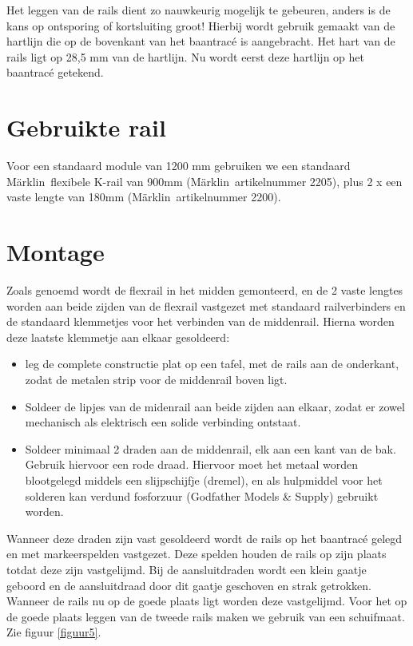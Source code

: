 \documentclass[12pt,a4paper]{report}
\newcommand*{\marklin}{M\"{a}rklin}
\newcommand*{\trace}{trac\'{e} }
\begin{document}
Het leggen van de rails dient zo nauwkeurig mogelijk te gebeuren, anders is de kans op ontsporing of kortsluiting groot! Hierbij wordt gebruik gemaakt van de hartlijn die op de bovenkant van het baan\trace is aangebracht.
Het hart van de rails ligt op 28,5 mm van de hartlijn. Nu wordt eerst deze hartlijn op het baan\trace getekend.

\section{Gebruikte rail}
Voor een standaard module van 1200 mm gebruiken we een standaard \marklin \ flexibele K-rail van 900mm (\marklin \ artikelnummer 2205), plus 2 x een vaste lengte van 180mm (\marklin \ artikelnummer 2200).

\section{Montage}
Zoals genoemd wordt de flexrail in het midden gemonteerd, en de 2 vaste lengtes worden aan beide zijden van de flexrail vastgezet met standaard railverbinders en de standaard klemmetjes voor het verbinden van de middenrail. Hierna worden deze laatste klemmetje aan elkaar gesoldeerd:

\begin{itemize}
\item leg de complete constructie plat op een tafel, met de rails aan de onderkant, zodat de metalen strip voor de middenrail boven ligt.
\item Soldeer de lipjes van de midenrail aan beide zijden aan elkaar, zodat er zowel mechanisch als elektrisch een solide verbinding ontstaat.
\item Soldeer minimaal 2 draden aan de middenrail, elk aan een kant van de bak. Gebruik hiervoor een rode draad. Hiervoor moet het metaal worden blootgelegd middels een slijpschijfje (dremel), en als hulpmiddel voor het solderen kan verdund fosforzuur (Godfather Models \& Supply) gebruikt worden.
\end{itemize}

Wanneer deze draden zijn vast gesoldeerd wordt de rails op het baan\trace gelegd en met markeerspelden vastgezet. Deze spelden houden de rails op zijn plaats totdat deze zijn vastgelijmd. Bij de aansluitdraden wordt een klein gaatje geboord en de aansluitdraad door dit gaatje geschoven en strak getrokken. Wanneer de rails nu op de goede plaats ligt worden deze vastgelijmd. Voor het op de goede plaats leggen van de tweede rails maken we gebruik van een schuifmaat. Zie figuur \ref{figuur5}.
\end{document}
